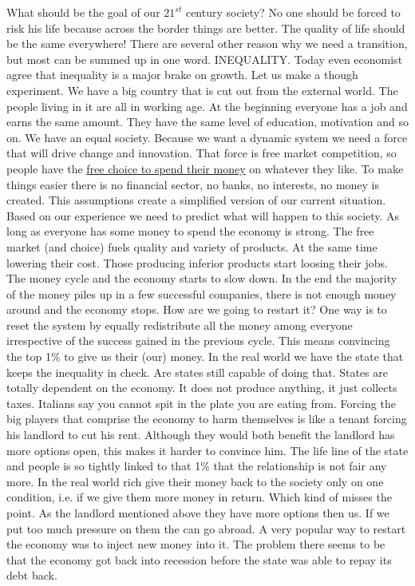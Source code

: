 \documentclass{article}
\begin{document}
What should be the goal of our $21^{st}$ century society?
No one should be forced to risk his life because across the border things are better.
The quality of life should be the same everywhere!
There are several other reason why we need a transition, but most can be summed up in one word.
INEQUALITY.
Today even economist agree that inequality is a major brake on growth\cite{inequality}.
Let us make a though experiment.
We have a big country that is cut out from the external world.
The people living in it are all in working age.
At the beginning everyone has a job and earns the same amount.
They have the same level of education, motivation and so on.
We have an equal society.
Because we want a dynamic system we need a force that will drive change and innovation.
That force is free market competition, so people have the \underline{free choice to spend their money} on whatever they like.
To make things easier there is no financial sector, no banks, no interests, no money is created.
This assumptions create a simplified version of our current situation.
Based on our experience we need to predict what will happen to this society.
As long as everyone has some money to spend the economy is strong.
The free market (and choice) fuels quality and variety of products.
At the same time lowering their cost.
Those producing inferior products start loosing their jobs.
The money cycle and the economy starts to slow down.
In the end the majority of the money piles up in a few successful companies, there is not enough money around and the economy stops.
How are we going to restart it?
One way is to reset the system by equally redistribute all the money among everyone irrespective of the success gained in the previous cycle.
This means convincing the top 1\% to give us their (our) money.
In the real world we have the state that keeps the inequality in check.
Are states still capable of doing that.
States are totally dependent on the economy.
It does not produce anything, it just collects taxes.
Italians say you cannot spit in the plate you are eating from.
Forcing the big players that comprise the economy to harm themselves is like a tenant forcing his landlord to cut his rent.
Although they would both benefit the landlord has more options open, this makes it harder to convince him.
The life line of the state and people is so tightly linked to that 1\% that the relationship is not fair any more.
In the real world rich give their money back to the society only on one condition, i.e. if we give them more money in return.
Which kind of misses the point.
As the landlord mentioned above they have more options then us.
If we put too much pressure on them the can go abroad.
A very popular way to restart the economy was to inject new money into it.
The problem there seems to be that the economy got back into recession before the state was able to repay its debt back.
\end{document}
